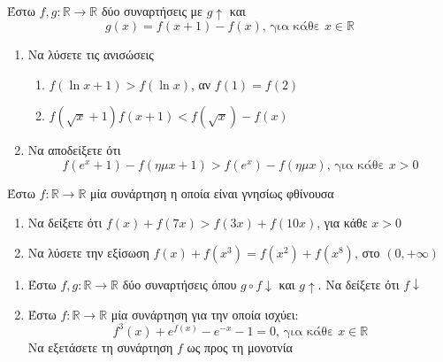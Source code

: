 \documentclass{presentation}
\begin{document}
\begin{askisi}
  Έστω $f,g:\mathbb{R}\to\mathbb{R}$ δύο συναρτήσεις με $g\uparrow$ και
  $$g(x)=f(x+1)-f(x)\text{, για κάθε } x\in\mathbb{R}$$
  \begin{enumerate}
    \item Να λύσετε τις ανισώσεις
          \begin{enumerate}
            \item $f(\ln x+1)>f(\ln x)$, αν $f(1)=f(2)$ \pause
            \item $f(\sqrt{x}+1)f(x+1)<f(\sqrt{x})-f(x)$ \pause
          \end{enumerate}
    \item Να αποδείξετε ότι  \pause
          $$f(e^x+1)-f(ημ x+1)>f(e^x)-f(ημ x)\text{, για κάθε } x>0$$
  \end{enumerate}
\end{askisi}

\begin{askisi}
  Έστω $f:\mathbb{R}\to\mathbb{R}$ μία συνάρτηση η οποία είναι γνησίως φθίνουσα
  \begin{enumerate}
    \item Να δείξετε ότι $f(x)+f(7x)>f(3x)+f(10x)$, για κάθε $x>0$ \pause
    \item Να λύσετε την εξίσωση $f(x)+f(x^3)=f(x^2)+f(x^8)$, στο $(0,+\infty)$
  \end{enumerate}
\end{askisi}

\begin{askisi}

  \begin{enumerate}
    \item Έστω $f,g:\mathbb{R}\to\mathbb{R}$ δύο συναρτήσεις όπου $g\circ f \downarrow$ και $g\uparrow$. Να δείξετε ότι $f\downarrow$ \pause
    \item Έστω $f:\mathbb{R}\to\mathbb{R}$ μία συνάρτηση για την οποία ισχύει:
          $$f^3(x)+e^{f(x)}-e^{-x}-1=0\text{, για κάθε } x\in\mathbb{R}$$
          Να εξετάσετε τη συνάρτηση $f$ ως προς τη μονοτνία
  \end{enumerate}
\end{askisi}
\end{document}
